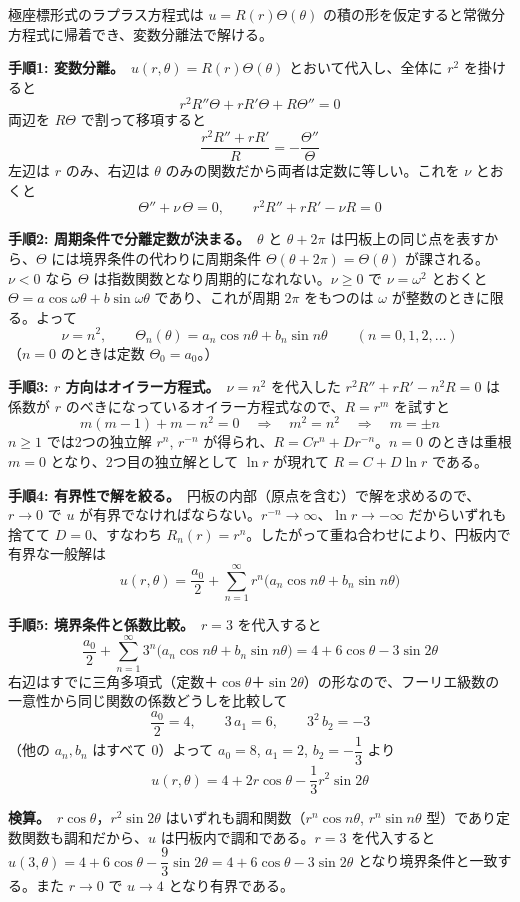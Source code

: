 
極座標形式のラプラス方程式は $u = R(r)\Theta(\theta)$ の積の形を仮定すると常微分方程式に帰着でき、変数分離法で解ける。

\textbf{手順1: 変数分離。}\ $u(r,\theta) = R(r)\Theta(\theta)$ とおいて代入し、全体に $r^2$ を掛けると
\[
r^2 R'' \Theta + r R' \Theta + R \Theta'' = 0
\]
両辺を $R\Theta$ で割って移項すると
\[
\frac{r^2 R'' + r R'}{R} = -\frac{\Theta''}{\Theta}
\]
左辺は $r$ のみ、右辺は $\theta$ のみの関数だから両者は定数に等しい。これを $\nu$ とおくと
\[
\Theta'' + \nu\,\Theta = 0, \qquad r^2 R'' + rR' - \nu R = 0
\]

\textbf{手順2: 周期条件で分離定数が決まる。}\ $\theta$ と $\theta + 2\pi$ は円板上の同じ点を表すから、$\Theta$ には境界条件の代わりに周期条件 $\Theta(\theta + 2\pi) = \Theta(\theta)$ が課される。$\nu < 0$ なら $\Theta$ は指数関数となり周期的になれない。$\nu \ge 0$ で $\nu = \omega^2$ とおくと $\Theta = a\cos\omega\theta + b\sin\omega\theta$ であり、これが周期 $2\pi$ をもつのは $\omega$ が整数のときに限る。よって
\[
\nu = n^2, \qquad
\Theta_n(\theta) = a_n \cos n\theta + b_n \sin n\theta \qquad (n = 0, 1, 2, \dots)
\]
（$n=0$ のときは定数 $\Theta_0 = a_0$。）

\textbf{手順3: $r$ 方向はオイラー方程式。}\ $\nu = n^2$ を代入した $r^2 R'' + rR' - n^2 R = 0$ は係数が $r$ のべきになっているオイラー方程式なので、$R = r^m$ を試すと
\[
m(m-1) + m - n^2 = 0
\quad\Longrightarrow\quad
m^2 = n^2
\quad\Longrightarrow\quad
m = \pm n
\]
$n \ge 1$ では2つの独立解 $r^n$, $r^{-n}$ が得られ、$R = C r^{n} + D r^{-n}$。$n = 0$ のときは重根 $m = 0$ となり、2つ目の独立解として $\ln r$ が現れて $R = C + D\ln r$ である。

\textbf{手順4: 有界性で解を絞る。}\ 円板の内部（原点を含む）で解を求めるので、$r \to 0$ で $u$ が有界でなければならない。$r^{-n} \to \infty$、$\ln r \to -\infty$ だからいずれも捨てて $D = 0$、すなわち $R_n(r) = r^n$。したがって重ね合わせにより、円板内で有界な一般解は
\[
u(r,\theta) = \frac{a_0}{2} + \sum_{n=1}^{\infty} r^{n}\bigl(a_n\cos n\theta + b_n\sin n\theta\bigr)
\]

\textbf{手順5: 境界条件と係数比較。}\ $r = 3$ を代入すると
\[
\frac{a_0}{2} + \sum_{n=1}^{\infty} 3^{n}\bigl(a_n\cos n\theta + b_n\sin n\theta\bigr) = 4 + 6\cos\theta - 3\sin 2\theta
\]
右辺はすでに三角多項式（定数＋$\cos\theta$＋$\sin 2\theta$）の形なので、フーリエ級数の一意性から同じ関数の係数どうしを比較して
\[
\frac{a_0}{2} = 4, \qquad 3\,a_1 = 6, \qquad 3^{2}\,b_2 = -3
\]
（他の $a_n, b_n$ はすべて $0$）よって $a_0 = 8$, $a_1 = 2$, $b_2 = -\dfrac{1}{3}$ より
\[
\boxed{\; u(r,\theta) = 4 + 2r\cos\theta - \frac{1}{3}r^{2}\sin 2\theta \;}
\]

\textbf{検算。}\ $r\cos\theta$，$r^2\sin2\theta$ はいずれも調和関数（$r^n\cos n\theta$, $r^n\sin n\theta$ 型）であり定数関数も調和だから、$u$ は円板内で調和である。$r=3$ を代入すると $u(3,\theta) = 4 + 6\cos\theta - \dfrac{9}{3}\sin2\theta = 4 + 6\cos\theta - 3\sin2\theta$ となり境界条件と一致する。また $r \to 0$ で $u \to 4$ となり有界である。

